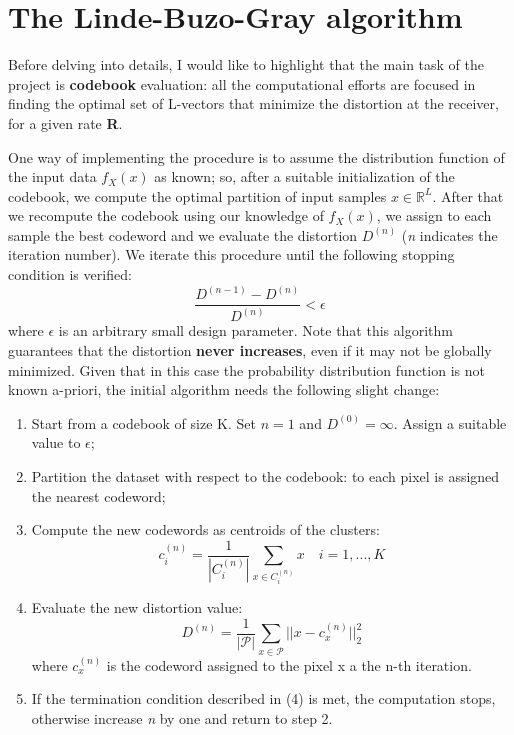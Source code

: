 \documentclass{article}
\begin{document}
\section{The Linde-Buzo-Gray algorithm}

Before delving into details, I would like to highlight that the main task of the project is \textbf{codebook} evaluation: all the computational efforts are focused in finding the optimal set of L-vectors that minimize the distortion at the receiver, for a given rate \textbf{R}.

One way of implementing the procedure is to assume the distribution function of the input data $f_X(x)$ as known; so, after a suitable initialization of the codebook, we compute the optimal partition of input samples $ x \in \mathbb{R}^L$. After that we recompute the codebook using our knowledge of $f_X(x)$, we assign to each sample the best codeword and we evaluate the distortion $D^{(n)}$ (\textit{n} indicates the iteration number). We iterate this procedure until the following stopping condition is verified: 
\begin{equation}
\frac{D^{(n-1)} - D^{(n)}}{D^{(n)}} < \epsilon
\end{equation}
where $\epsilon$ is an arbitrary small design parameter. Note that this algorithm guarantees that the distortion \textbf{never increases}, even if it may not be globally minimized.
Given that in this case the probability distribution function is not known a-priori, the initial algorithm needs the following slight change: 

\begin{enumerate}
	\item Start from a codebook of size K. Set $n = 1$ and $ D^{(0)} = \infty $. Assign a suitable value to $\epsilon$; %
	\item Partition the dataset with respect to the codebook: to each pixel is assigned the nearest codeword;
	\item Compute the new codewords as centroids of the clusters:
	\begin{equation}
	c_i^{(n)} = \frac{1}{|C_i^{(n)}|} \sum_{x \in C_i^{(n)}} x \quad i = 1,...,K
	\end{equation}
	\item Evaluate the new distortion value:
	\begin{equation}
	D^{(n)} = \frac{1}{|\mathcal{P}|} \sum_{x \in \mathcal{P}} ||x - c_x^{(n)}||_2^2
	\end{equation}
	where $c_x^{(n)}$ is the codeword assigned to the pixel x a the n-th iteration.
	\item If the termination condition described in (4) is met, the computation stops, otherwise increase \textit{n} by one and return to step 2.
\end{enumerate}
\end{document}
